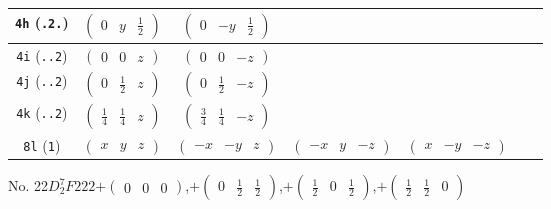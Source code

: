 \documentclass[fleqn,9pt,landscape]{jsarticle}
\begin{document}
\begin{center}
\begin{longtable}{ccccccc}
{\tt 4h} ({\tt .2.}) & $ \begin{pmatrix} 0 & y & \frac{1}{2} \end{pmatrix} $ & $ \begin{pmatrix} 0 & - y & \frac{1}{2} \end{pmatrix} $ & $  $ & $  $ \\ \hline
{\tt 4i} ({\tt ..2}) & $ \begin{pmatrix} 0 & 0 & z \end{pmatrix} $ & $ \begin{pmatrix} 0 & 0 & - z \end{pmatrix} $ & $  $ & $  $ \\ \hline
{\tt 4j} ({\tt ..2}) & $ \begin{pmatrix} 0 & \frac{1}{2} & z \end{pmatrix} $ & $ \begin{pmatrix} 0 & \frac{1}{2} & - z \end{pmatrix} $ & $  $ & $  $ \\ \hline
{\tt 4k} ({\tt ..2}) & $ \begin{pmatrix} \frac{1}{4} & \frac{1}{4} & z \end{pmatrix} $ & $ \begin{pmatrix} \frac{3}{4} & \frac{1}{4} & - z \end{pmatrix} $ & $  $ & $  $ \\ \hline
{\tt 8l} ({\tt 1}) & $ \begin{pmatrix} x & y & z \end{pmatrix} $ & $ \begin{pmatrix} - x & - y & z \end{pmatrix} $ & $ \begin{pmatrix} - x & y & - z \end{pmatrix} $ & $ \begin{pmatrix} x & - y & - z \end{pmatrix} $ \\
\end{longtable}
\end{center}
\newpage
No. 22\quad$D_{2}^{7}$\quad$F222$\quad[ orthorhombic ]\quad$+\begin{pmatrix} 0 & 0 & 0 \end{pmatrix}$,\quad $+\begin{pmatrix} 0 & \frac{1}{2} & \frac{1}{2} \end{pmatrix}$,\quad $+\begin{pmatrix} \frac{1}{2} & 0 & \frac{1}{2} \end{pmatrix}$,\quad $+\begin{pmatrix} \frac{1}{2} & \frac{1}{2} & 0 \end{pmatrix}$
\end{document}
